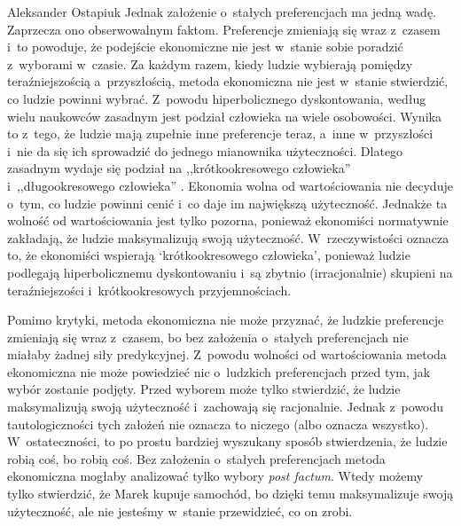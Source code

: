 \begin{artplenv}{Aleksander Ostapiuk}
Jednak założenie o~stałych preferencjach ma jedną wadę. Zaprzecza ono obserwowalnym faktom. Preferencje zmieniają się
wraz z~czasem i~to powoduje, że podejście ekonomiczne nie jest w~stanie sobie poradzić z~wyborami w~czasie. Za każdym
razem, kiedy ludzie wybierają pomiędzy teraźniejszością a~przyszłością, metoda ekonomiczna nie jest w~stanie
stwierdzić, co ludzie powinni wybrać. Z~powodu hiperbolicznego dyskontowania, według wielu naukowców zasadnym jest
podział człowieka na wiele osobowości. Wynika to z~tego, że ludzie mają zupełnie inne preferencje
teraz, a~inne w~przyszłości i~nie da się ich sprowadzić do jednego mianownika użyteczności.
Dlatego zasadnym wydaje się podział na
,,krótkookresowego człowieka'' i~,,długookresowego człowieka''
\parencites{ostapiuk_human_2018}[więcej na temat koncepcji wielu osobowości][]{ainslie_breakdown_2001}{cowen_self-constraint_1991}{davis_theory_2003}%
{elster_multiple_1986}{frederick_time_2002}{fudenberg_dual-self_2006}{heilmann_rationality_2010-1}%
{loewenstein_out_1996}{schelling_intimate_1980,schelling_self-command_1984,schelling_enforcing_1985,schelling_coping_1996}%
{read_which_2006}{strotz_myopia_1955}{thaler_economic_1981}.
Ekonomia wolna od wartościowania nie decyduje o~tym, co ludzie powinni cenić i~co daje im największą
użyteczność. Jednakże ta wolność od wartościowania jest tylko pozorna, ponieważ ekonomiści normatywnie zakładają, że
ludzie maksymalizują swoją użyteczność. W~rzeczywistości oznacza to, że ekonomiści wspierają `krótkookresowego
człowieka', ponieważ ludzie podlegają hiperbolicznemu dyskontowaniu i~są zbytnio (irracjonalnie) skupieni na
teraźniejszości i~krótkookresowych przyjemnościach.

Pomimo krytyki, metoda ekonomiczna nie może przyznać, że ludzkie preferencje zmieniają się wraz z~czasem, bo bez
założenia o~stałych preferencjach nie miałaby żadnej siły predykcyjnej. Z~powodu wolności od wartościowania metoda
ekonomiczna nie może powiedzieć nic o~ludzkich preferencjach przed tym, jak wybór zostanie podjęty. Przed wyborem może
tylko stwierdzić, że ludzie maksymalizują swoją użyteczność i~zachowają się racjonalnie. Jednak z~powodu
tautologiczności tych założeń nie oznacza to niczego (albo oznacza wszystko). W~ostateczności, to po prostu bardziej
wyszukany sposób stwierdzenia, że ludzie robią coś, bo robią coś. Bez założenia o~stałych preferencjach metoda
ekonomiczna mogłaby analizować tylko wybory \textit{post factum}. Wtedy możemy tylko stwierdzić, że Marek kupuje
samochód, bo dzięki temu maksymalizuje swoją użyteczność, ale nie jesteśmy w~stanie przewidzieć, co on zrobi. 


\end{artplenv}
